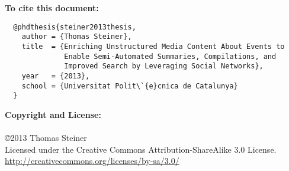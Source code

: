 \begin{acknowledgements}


\vspace{40mm}

\textbf{To cite this document:}

\small
\begin{verbatim}
  @phdthesis{steiner2013thesis,
    author = {Thomas Steiner},
    title  = {Enriching Unstructured Media Content About Events to
              Enable Semi-Automated Summaries, Compilations, and
              Improved Search by Leveraging Social Networks},
    year   = {2013},
    school = {Universitat Polit\`{e}cnica de Catalunya}
  }
\end{verbatim}

\normalsize

\vspace{10mm}
\textbf{Copyright and License:}\\\\
\small \copyright \normalsize 2013 Thomas Steiner\\
Licensed under the Creative Commons Attribution-ShareAlike 3.0 License.\\
\url{http://creativecommons.org/licenses/by-sa/3.0/}

\end{acknowledgements}

